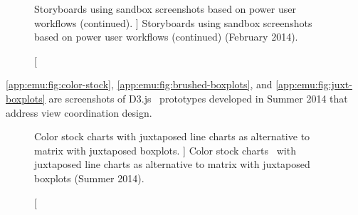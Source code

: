 

\begin{figure}
	\centering
	\caption
	[
	    Storyboards using sandbox screenshots based on power user workflows (continued).
	]
	{
    	Storyboards using sandbox screenshots based on power user workflows (continued) (February 2014). 
	}
	\centering
	\label{app:emu:fig:storyboards-2}
\end{figure}


\autoref{app:emu:fig:color-stock}, \autoref{app:emu:fig:brushed-boxplots}, and \autoref{app:emu:fig:juxt-boxplots} are screenshots of D3.js~\cite{Bostock2011} prototypes developed in Summer 2014 that address view coordination design.


\begin{figure}
	\centering
	\caption
	[
	    Color stock charts with juxtaposed line charts as alternative to matrix with juxtaposed boxplots.
	]
	{
    	Color stock charts~\cite{Albers2014} with juxtaposed line charts as alternative to matrix with juxtaposed boxplots (Summer 2014). 
	}
	\centering
	\label{app:emu:fig:color-stock}
\end{figure}

